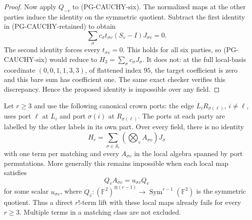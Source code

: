 \begin{proof}
Now apply $Q_{-v}$ to (PG-CAUCHY-six). The normalized maps at the other
parties induce the identity on the symmetric quotient. Subtract the first
identity in (PG-CAUCHY-retained) to obtain
\[
 \sum_\sigma c_\sigma t_{\sigma v}(S_v-I)J_{\sigma v}=0.
\]
The second identity forces every $t_{\sigma v}=0$. This holds for all six
parties, so (PG-CAUCHY-six) would reduce to
$H_3=\sum_\sigma c_\sigma J_\sigma$. It does not: at the full local-basis
coordinate $(0,0,1,1,3,3)$, of flattened index $95$, the target coefficient
is zero and this bare sum has coefficient one. The same exact checker
verifies this discrepancy. Hence the proposed identity is impossible over
any field.
\end{proof}

\begin{proposition}
\label{pg:cauchy-lift-nogo}
Let $r\geq3$ and use the following canonical crown ports: the edge
$L_iR_{\sigma(\ell)}$, $i\ne\ell$, uses port $\ell$ at $L_i$ and port
$\sigma(i)$ at $R_{\sigma(\ell)}$. The ports at each party are labelled
by the other labels in its own part. Over every field, there is no identity
\[
 H_r=\sum_{\sigma\in S_r}
       \left(\bigotimes_v A_{\sigma v}\right)J_\sigma
 \tag{PG-CAUCHY-general-lift}
\]
with one term per matching and every $A_{\sigma v}$ in the local algebra
spanned by port permutations. More generally this remains impossible when
each local map satisfies
\[
 Q_v A_{\sigma v}=u_{\sigma v}Q_v
\]
for some scalar $u_{\sigma v}$, where
$Q_v:(\mathbb F^2)^{\otimes(r-1)}\to
\operatorname{Sym}^{r-1}(\mathbb F^2)$ is the symmetric quotient.
Thus a direct $r!$-term lift with these local maps already fails for every
$r\geq3$. Multiple terms in a matching class are not excluded.
\end{proposition}
